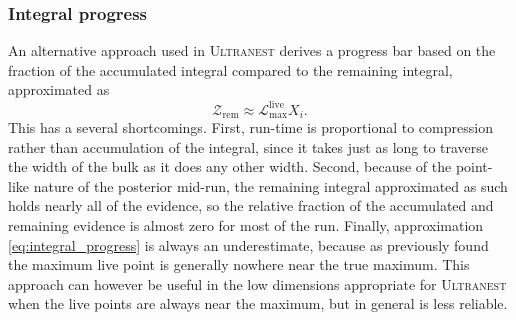 \documentclass[usenatbib]{mnras}
\newcommand{\Like}{\mathcal{L}}
\begin{document}
\subsubsection{Integral progress}
An alternative approach used in \textsc{Ultranest} \citep{ultranest} derives a progress bar based on the fraction of the accumulated integral compared to the remaining integral, approximated as 
\begin{equation}\label{eq:integral_progress}
    \mathcal{Z}_\mathrm{rem} \approx \Like_\mathrm{max}^{\mathrm{live}} X_i.
\end{equation}
This has a several shortcomings. First, run-time is proportional to compression rather than accumulation of the integral, since it takes just as long to traverse the width of the bulk as it does any other width. Second, because of the point-like nature of the posterior mid-run, the remaining integral approximated as such holds nearly all of the evidence, so the relative fraction of the accumulated and remaining evidence is almost zero for most of the run. Finally, approximation \eqref{eq:integral_progress} is always an underestimate, because as previously found the maximum live point is generally nowhere near the true maximum. This approach can however be useful in the low dimensions appropriate for \textsc{Ultranest} when the live points are always near the maximum, but in general is less reliable.
\end{document}
